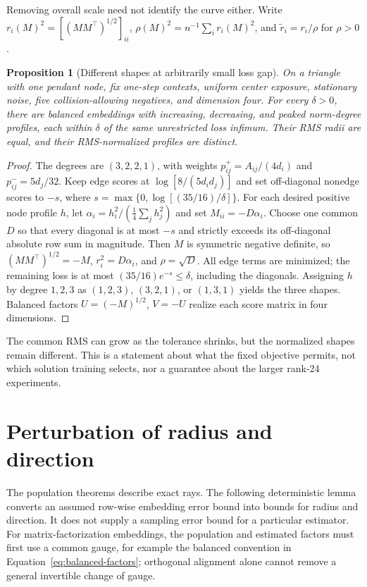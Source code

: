 \documentclass[aps,pre,reprint,superscriptaddress,longbibliography]{revtex4-2}
\newtheorem{proposition}[theorem]{Proposition}
\begin{document}
Removing overall scale need not identify the curve either.
Write \(r_i(M)^2=[(MM^\top)^{1/2}]_{ii}\), \(\rho(M)^2=n^{-1}\sum_i r_i(M)^2\), and \(\widetilde r_i=r_i/\rho\) for \(\rho>0\).
\begin{proposition}[Different shapes at arbitrarily small loss gap]
\label{prop:normalized-shapes}
On a triangle with one pendant node, fix one-step contexts, uniform center exposure, stationary noise, five collision-allowing negatives, and dimension four.
For every \(\delta>0\), there are balanced embeddings with increasing, decreasing, and peaked norm-degree profiles, each within \(\delta\) of the same unrestricted loss infimum.
Their RMS radii are equal, and their RMS-normalized profiles are distinct.
\end{proposition}

\begin{proof}
The degrees are \((3,2,2,1)\), with weights \(p^+_{ij}=A_{ij}/(4d_i)\) and \(p^-_{ij}=5d_j/32\).
Keep edge scores at \(\log[8/(5d_id_j)]\) and set off-diagonal nonedge scores to \(-s\), where \(s=\max\{0,\log[(35/16)/\delta]\}\).
For each desired positive node profile \(h\), let \(\alpha_i=h_i^2/(\frac14\sum_jh_j^2)\) and set \(M_{ii}=-D\alpha_i\).
Choose one common \(D\) so that every diagonal is at most \(-s\) and strictly exceeds its off-diagonal absolute row sum in magnitude.
Then \(M\) is symmetric negative definite, so \((MM^\top)^{1/2}=-M\), \(r_i^2=D\alpha_i\), and \(\rho=\sqrt D\).
All edge terms are minimized; the remaining loss is at most \((35/16)e^{-s}\le\delta\), including the diagonals.
Assigning \(h\) by degree \(1,2,3\) as \((1,2,3)\), \((3,2,1)\), or \((1,3,1)\) yields the three shapes.
Balanced factors \(U=(-M)^{1/2}\), \(V=-U\) realize each score matrix in four dimensions.
\end{proof}

The common RMS can grow as the tolerance shrinks, but the normalized shapes remain different.
This is a statement about what the fixed objective permits, not which solution training selects, nor a guarantee about the larger rank-24 experiments.

\section{Perturbation of radius and direction}
\label{sec:finite-sample}

The population theorems describe exact rays.
The following deterministic lemma converts an assumed row-wise embedding error bound into bounds for radius and direction.
It does not supply a sampling error bound for a particular estimator.
For matrix-factorization embeddings, the population and estimated factors must first use a common gauge, for example the balanced convention in Equation~\eqref{eq:balanced-factors}; orthogonal alignment alone cannot remove a general invertible change of gauge.
\end{document}
